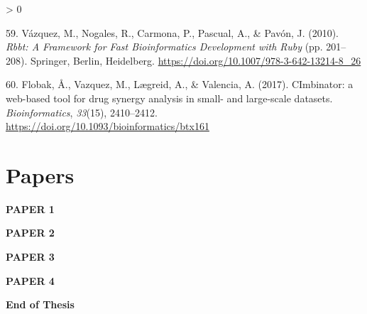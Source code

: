\documentclass[
  12pt,
]{book}
\newlength{\cslhangindent}
\newenvironment{CSLReferences}[2] %
 {%
  \setlength{\parindent}{0pt}
  \ifodd #1 \everypar{\setlength{\hangindent}{\cslhangindent}}\ignorespaces\fi
  \ifnum #2 > 0
  \setlength{\parskip}{#2\baselineskip}
  \fi
 }%
 {}
\begin{document}
\begin{CSLReferences}{1}{0}
\leavevmode\hypertarget{ref-Vazquez2010}{}%
59. Vázquez, M., Nogales, R., Carmona, P., Pascual, A., \& Pavón, J. (2010). \emph{{Rbbt: A Framework for Fast Bioinformatics Development with Ruby}} (pp. 201--208). Springer, Berlin, Heidelberg. \url{https://doi.org/10.1007/978-3-642-13214-8_26}

\leavevmode\hypertarget{ref-Flobak2017}{}%
60. Flobak, Å., Vazquez, M., Lægreid, A., \& Valencia, A. (2017). {CImbinator: a web-based tool for drug synergy analysis in small- and large-scale datasets}. \emph{Bioinformatics}, \emph{33}(15), 2410--2412. \url{https://doi.org/10.1093/bioinformatics/btx161}

\end{CSLReferences}

\backmatter

\chapter{Papers}
\newpage

\begin{center}
\textbf{\fontsize{70}{1} \selectfont PAPER 1}
\end{center}



\begin{center}
\textbf{\fontsize{70}{1} \selectfont PAPER 2}
\end{center}



\begin{center}
\textbf{\fontsize{70}{1} \selectfont PAPER 3}
\end{center}



\begin{center}
\textbf{\fontsize{70}{1} \selectfont PAPER 4}
\end{center}



\begin{center}
\textbf{\fontsize{70}{1} \selectfont End of Thesis}
\end{center}

%
\end{document}
